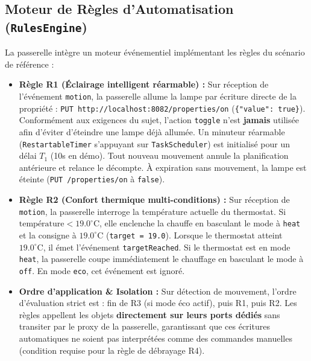 \documentclass[10pt,a4paper]{article}
\begin{document}
\subsection{Moteur de Règles d'Automatisation (\texttt{RulesEngine})}
La passerelle intègre un moteur événementiel implémentant les règles du scénario de référence :
\begin{itemize}
  \item \textbf{Règle R1 (Éclairage intelligent réarmable) :}
  Sur réception de l'événement \texttt{motion}, la passerelle allume la lampe par écriture directe de la propriété : \texttt{PUT http://localhost:8082/properties/on} (\texttt{\{"value": true\}}). Conformément aux exigences du sujet, l'action \texttt{toggle} n'est \textbf{jamais} utilisée afin d'éviter d'éteindre une lampe déjà allumée.
  Un minuteur réarmable (\texttt{RestartableTimer} s'appuyant sur \texttt{TaskScheduler}) est initialisé pour un délai $T_1$ (10s en démo). Tout nouveau mouvement annule la planification antérieure et relance le décompte. À expiration sans mouvement, la lampe est éteinte (\texttt{PUT /properties/on} à \texttt{false}).
  \item \textbf{Règle R2 (Confort thermique multi-conditions) :}
  Sur réception de \texttt{motion}, la passerelle interroge la température actuelle du thermostat. Si $\text{température} < 19.0^\circ\text{C}$, elle enclenche la chauffe en basculant le mode à \texttt{heat} et la consigne à $19.0^\circ\text{C}$ (\texttt{target = 19.0}).
  Lorsque le thermostat atteint $19.0^\circ\text{C}$, il émet l'événement \texttt{targetReached}. Si le thermostat est en mode \texttt{heat}, la passerelle coupe immédiatement le chauffage en basculant le mode à \texttt{off}. En mode \texttt{eco}, cet événement est ignoré.
  \item \textbf{Ordre d'application \& Isolation :} Sur détection de mouvement, l'ordre d'évaluation strict est : fin de R3 (si mode éco actif), puis R1, puis R2.
  Les règles appellent les objets \textbf{directement sur leurs ports dédiés} sans transiter par le proxy de la passerelle, garantissant que ces écritures automatiques ne soient pas interprétées comme des commandes manuelles (condition requise pour la règle de débrayage R4).
\end{itemize}
\end{document}

